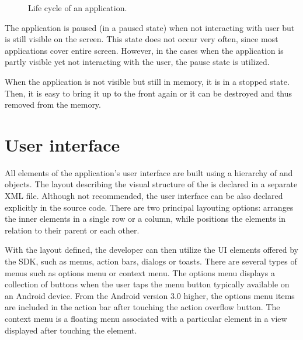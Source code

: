 \begin{figure}[h!]
    \caption{Life cycle of an application.}
\end{figure}

The application is paused (in a paused state) when not interacting with user but is still visible on the screen.
This state does not occur very often, since most applications cover entire screen.
However, in the cases when the application is partly visible yet not interacting with the user, the pause state is utilized. 

When the application is not visible but still in memory, it is in a stopped state.
Then, it is easy to bring it up to the front again or it can be destroyed and thus removed from the memory.

\section{User interface}
\label{sec:ui}

All elements of the application's user interface are built using a hierarchy of  and  objects.
The layout describing the visual structure of the  is declared in a separate XML file.
Although not recommended, the user interface can be also declared explicitly in the source code. 
There are two principal layouting options:  arranges the inner elements in a single row or a column,
while  positions the elements in relation to their parent or each other.

With the layout defined, the developer can then utilize the UI elements offered by the SDK, such as menus, action bars, dialogs or toasts.
There are several types of menus such as options menu or context menu. 
The options menu displays a collection of buttons when the user taps the menu button typically available on an Android device. 
From the Android version 3\@.0 higher, the options menu items are included in the action bar after touching the action overflow button. 
The context menu is a floating menu associated with a particular element in a view displayed after touching the element.

